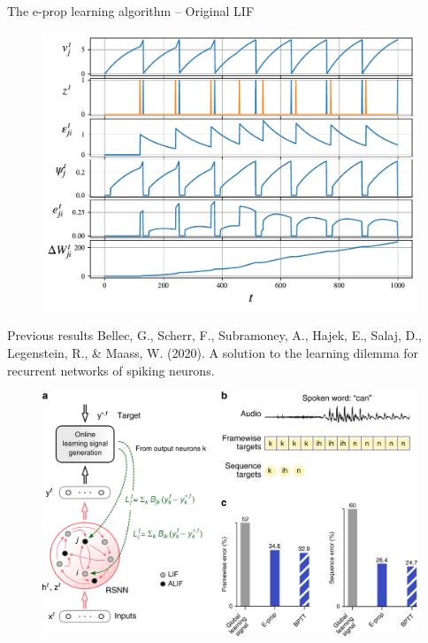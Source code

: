 \documentclass[t]{beamer}
\begin{document}
\begin{frame}{The e-prop learning algorithm -- Original LIF}
	
	\begin{figure}[!ht]
		\includegraphics[width=0.8\linewidth]{eprop_demo_bellec.pdf}
	\end{figure}
	
\end{frame}

\begin{frame}{Previous results}
\tiny{
Bellec, G., Scherr, F., Subramoney, A., Hajek, E., Salaj, D., Legenstein, R., \& Maass, W. (2020). A solution to the learning dilemma for recurrent networks of spiking neurons.}
	
\begin{figure}[!ht]
		\includegraphics[width=0.8\linewidth]{timitperformance.png}
	\end{figure}
	
\end{frame}
\end{document}
